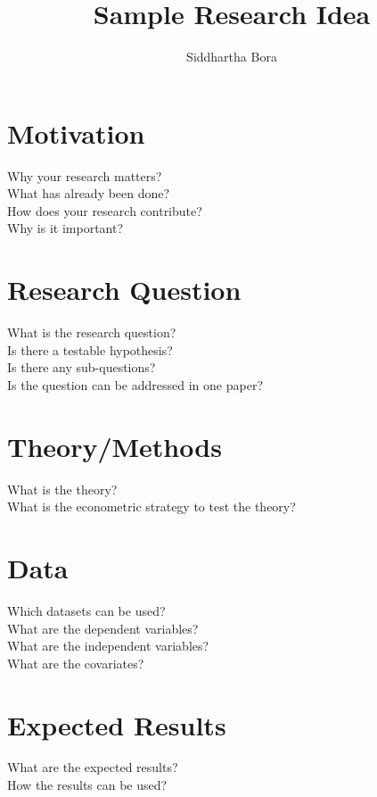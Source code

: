 \documentclass{article}
\title{Sample Research Idea}
\author{Siddhartha Bora}
\begin{document}
\maketitle

\section{Motivation}
Why your research matters?\\
What has already been done?\\
How does your research contribute?\\
Why is it important?
\section{Research Question}
What is the research question?\\
Is there a testable hypothesis?\\
Is there any sub-questions?\\
Is the question can be addressed in one paper?

   
\section{Theory/Methods}
What is the theory?\\
What is the econometric strategy to test the theory?

\section{Data}
Which datasets can be used?\\
What are the dependent variables?\\
What are the independent variables?\\
What are the covariates?\\
\section{Expected Results}
What are the expected results?\\
How the results can be used?\\

 
\end{document}
